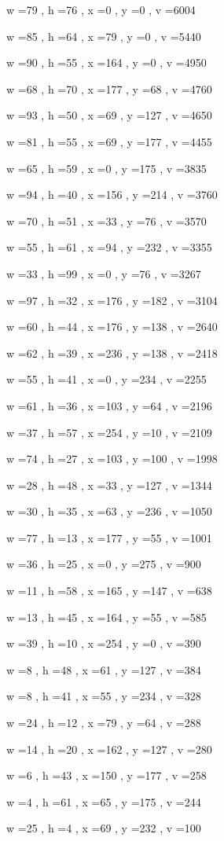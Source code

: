 \documentclass[11pt]{article}
\begin{document}
w =79 , h =76 , x =0 , y =0 , v =6004
\par
w =85 , h =64 , x =79 , y =0 , v =5440
\par
w =90 , h =55 , x =164 , y =0 , v =4950
\par
w =68 , h =70 , x =177 , y =68 , v =4760
\par
w =93 , h =50 , x =69 , y =127 , v =4650
\par
w =81 , h =55 , x =69 , y =177 , v =4455
\par
w =65 , h =59 , x =0 , y =175 , v =3835
\par
w =94 , h =40 , x =156 , y =214 , v =3760
\par
w =70 , h =51 , x =33 , y =76 , v =3570
\par
w =55 , h =61 , x =94 , y =232 , v =3355
\par
w =33 , h =99 , x =0 , y =76 , v =3267
\par
w =97 , h =32 , x =176 , y =182 , v =3104
\par
w =60 , h =44 , x =176 , y =138 , v =2640
\par
w =62 , h =39 , x =236 , y =138 , v =2418
\par
w =55 , h =41 , x =0 , y =234 , v =2255
\par
w =61 , h =36 , x =103 , y =64 , v =2196
\par
w =37 , h =57 , x =254 , y =10 , v =2109
\par
w =74 , h =27 , x =103 , y =100 , v =1998
\par
w =28 , h =48 , x =33 , y =127 , v =1344
\par
w =30 , h =35 , x =63 , y =236 , v =1050
\par
w =77 , h =13 , x =177 , y =55 , v =1001
\par
w =36 , h =25 , x =0 , y =275 , v =900
\par
w =11 , h =58 , x =165 , y =147 , v =638
\par
w =13 , h =45 , x =164 , y =55 , v =585
\par
w =39 , h =10 , x =254 , y =0 , v =390
\par
w =8 , h =48 , x =61 , y =127 , v =384
\par
w =8 , h =41 , x =55 , y =234 , v =328
\par
w =24 , h =12 , x =79 , y =64 , v =288
\par
w =14 , h =20 , x =162 , y =127 , v =280
\par
w =6 , h =43 , x =150 , y =177 , v =258
\par
w =4 , h =61 , x =65 , y =175 , v =244
\par
w =25 , h =4 , x =69 , y =232 , v =100
\par
\newpage
\end{document}
